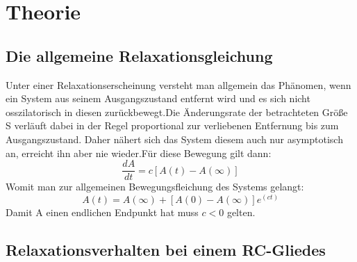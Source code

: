 \section{Theorie}
\label{sec:Theorie}
\subsection{Die allgemeine Relaxationsgleichung}
Unter einer Relaxationserscheinung versteht man allgemein das Phänomen, wenn
 ein System aus seinem Ausgangszustand entfernt wird und es sich nicht osszilatorisch
 in diesen zurückbewegt.Die Änderungsrate der betrachteten Größe S verläuft dabei
 in der Regel proportional zur verliebenen Entfernung bis zum Ausgangszustand. Daher nähert sich
 das System diesem auch nur asymptotisch an, erreicht ihn aber nie wieder.Für diese
 Bewegung gilt dann:
 \begin{equation}
   \frac{dA}{dt} = c[A(t)-A(\infty)]
 \end{equation}
Womit man zur allgemeinen Bewegungsfleichung des Systems gelangt:
\begin{equation}
  A(t) = A(\infty)+[A(0)-A(\infty)]e^(ct)
\end{equation}
Damit A einen endlichen Endpunkt hat muss $ c<0$ gelten.

\subsection{Relaxationsverhalten bei einem RC-Gliedes}
